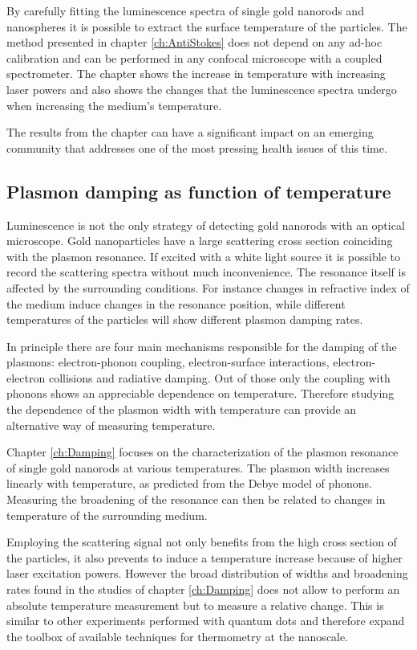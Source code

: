 By carefully fitting the luminescence spectra of single gold nanorods and
nanospheres it is possible to extract the surface temperature of the particles.
The method presented in chapter \ref{ch:AntiStokes} does not depend on any
ad-hoc calibration and can be performed in any confocal microscope with a
coupled spectrometer. The chapter shows the increase in temperature with
increasing laser powers and also shows the changes that the luminescence spectra
undergo when increasing the medium's temperature.

The results from the chapter can have a significant impact on an emerging
community that addresses one of the most pressing health issues of this
time.

\subsection{Plasmon damping as function of temperature}
Luminescence is not the only strategy of detecting gold nanorods with an optical
microscope. Gold nanoparticles have a large scattering cross section coinciding
with the plasmon resonance. If excited with a white light source it is possible
to record the scattering spectra without much inconvenience. The resonance
itself is affected by the surrounding conditions\cite{Liu2009b,Konrad2013}. For
instance changes in refractive index of the medium induce changes in the
resonance position, while different temperatures of the particles will show
different plasmon damping rates.

In principle there are four main mechanisms responsible for the damping of the
plasmons\cite{Sonnichsen2002,Novo2006,Hu2008}: electron-phonon coupling,
electron-surface interactions, electron-electron collisions and radiative
damping. Out of those only the coupling with phonons shows an appreciable
dependence on temperature\cite{Liu2009b,Konrad2013}. Therefore studying the
dependence of the plasmon width with temperature can provide an alternative way
of measuring temperature.

Chapter \ref{ch:Damping} focuses on the characterization of the plasmon
resonance of single gold nanorods at various temperatures. The plasmon width
increases linearly with temperature, as predicted from the Debye model of
phonons. Measuring the broadening of the resonance can then be related to
changes in temperature of the surrounding medium. 

Employing the scattering signal not only benefits from the high cross section of
the particles, it also prevents to induce a temperature increase because of
higher laser excitation powers. However the broad distribution of widths and
broadening rates found in the studies of chapter \ref{ch:Damping} does not allow
to perform an absolute temperature measurement but to measure a relative change.
This is similar to other experiments performed with quantum dots and therefore
expand the toolbox of available techniques for thermometry at the nanoscale.

